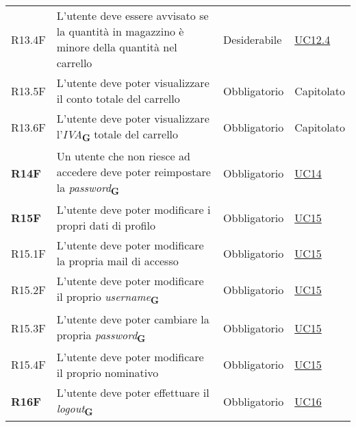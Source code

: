 \begin{center}
\begin{longtable}[!h]{p{50px} p{245px} p{75px} p{50px}}
        R13.4F                                & L'utente deve essere avvisato se la quantità in magazzino è minore della quantità nel carrello      & Desiderabile             & \hyperref[sec:UC12.4]{UC12.4}                \\
        R13.5F                                & L'utente deve poter visualizzare il conto totale del carrello                                       & Obbligatorio             & Capitolato                                   \\
        R13.6F                                & L'utente deve poter visualizzare l'\textit{IVA}\textsubscript{\textbf{G}} totale del carrello                                 & Obbligatorio             & Capitolato                                   \\
        \textbf{R14F}                         & Un utente che non riesce ad accedere deve poter reimpostare la \textit{password}\textsubscript{\textbf{G}}                             & Obbligatorio             & \hyperref[sec:UC14]{UC14}                    \\
        \textbf{R15F}                         & L'utente deve poter modificare i propri dati di profilo                                             & Obbligatorio             & \hyperref[sec:UC15]{UC15}                    \\
        R15.1F                                & L'utente deve poter modificare la propria mail di accesso                                           & Obbligatorio             & \hyperref[sec:UC15]{UC15}                    \\
        R15.2F                                & L'utente deve poter modificare il proprio \textit{username}\textsubscript{\textbf{G}}                                                  & Obbligatorio             & \hyperref[sec:UC15]{UC15}                    \\
        R15.3F                                & L'utente deve poter cambiare la propria \textit{password}\textsubscript{\textbf{G}}                                                    & Obbligatorio             & \hyperref[sec:UC15]{UC15}                    \\
        R15.4F                                & L'utente deve poter modificare il proprio nominativo                                                & Obbligatorio             & \hyperref[sec:UC15]{UC15}                    \\
        \textbf{R16F}                         & L'utente deve poter effettuare il \textit{logout}\textsubscript{\textbf{G}}                                                            & Obbligatorio             & \hyperref[sec:UC16]{UC16}                    \\

\end{longtable}
\end{center}
